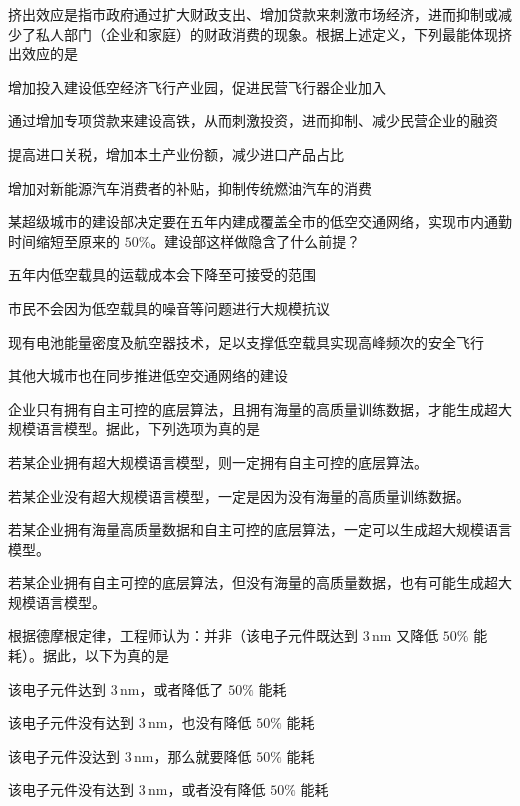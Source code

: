 \documentclass{exam-zh}
\begin{document}
\begin{question}
挤出效应是指市政府通过扩大财政支出、增加贷款来刺激市场经济，进而抑制或减少了私人部门（企业和家庭）的财政消费的现象。根据上述定义，下列最能体现挤出效应的是 \paren[]
\begin{choices}
  \item 增加投入建设低空经济飞行产业园，促进民营飞行器企业加入
  \item 通过增加专项贷款来建设高铁，从而刺激投资，进而抑制、减少民营企业的融资
  \item 提高进口关税，增加本土产业份额，减少进口产品占比
  \item 增加对新能源汽车消费者的补贴，抑制传统燃油汽车的消费
\end{choices}
\end{question}

\begin{question}
某超级城市的建设部决定要在五年内建成覆盖全市的低空交通网络，实现市内通勤时间缩短至原来的 $50\%$。建设部这样做隐含了什么前提？\paren[]
\begin{choices}
  \item 五年内低空载具的运载成本会下降至可接受的范围
  \item 市民不会因为低空载具的噪音等问题进行大规模抗议
  \item 现有电池能量密度及航空器技术，足以支撑低空载具实现高峰频次的安全飞行
  \item 其他大城市也在同步推进低空交通网络的建设
\end{choices}
\end{question}

\begin{question}
企业只有拥有自主可控的底层算法，且拥有海量的高质量训练数据，才能生成超大规模语言模型。据此，下列选项为真的是 \paren[]
\begin{choices}
  \item 若某企业拥有超大规模语言模型，则一定拥有自主可控的底层算法。
  \item 若某企业没有超大规模语言模型，一定是因为没有海量的高质量训练数据。
  \item 若某企业拥有海量高质量数据和自主可控的底层算法，一定可以生成超大规模语言模型。
  \item 若某企业拥有自主可控的底层算法，但没有海量的高质量数据，也有可能生成超大规模语言模型。
\end{choices}
\end{question}

\begin{question}
根据德摩根定律，工程师认为：并非（该电子元件既达到 $3\,\mathrm{nm}$ 又降低 $50\%$ 能耗）。据此，以下为真的是 \paren[]
\begin{choices}
  \item 该电子元件达到 $3\,\mathrm{nm}$，或者降低了 $50\%$ 能耗
  \item 该电子元件没有达到 $3\,\mathrm{nm}$，也没有降低 $50\%$ 能耗
  \item 该电子元件没达到 $3\,\mathrm{nm}$，那么就要降低 $50\%$ 能耗
  \item 该电子元件没有达到 $3\,\mathrm{nm}$，或者没有降低 $50\%$ 能耗
\end{choices}
\end{question}
\end{document}
